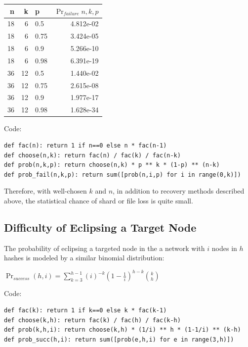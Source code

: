 \documentclass[a4paper,10pt]{article}
\begin{document}
\begin{table}[hbt!]
\begin{center}
\begin{tabular}{r r l r}
n & k & p & $\Pr_{failure}{n,k,p}$\\
\hline  18& 6&   0.5  & 4.812e-02\\
\hline  18& 6&   0.75&3.424e-05\\
\hline  18& 6&   0.9  & 5.266e-10\\
\hline  18& 6&   0.98&6.391e-19\\
\hline  36& 12& 0.5  &1.440e-02\\
\hline  36& 12&  0.75&2.615e-08\\
\hline  36& 12&  0.9  &1.977e-17\\
\hline  36& 12&  0.98&1.628e-34\\
\end{tabular}
\end{center}
\end{table}

Code:
\begin{lstlisting}
def fac(n): return 1 if n==0 else n * fac(n-1)
def choose(n,k): return fac(n) / fac(k) / fac(n-k)
def prob(n,k,p): return choose(n,k) * p ** k * (1-p) ** (n-k)
def prob_fail(n,k,p): return sum([prob(n,i,p) for i in range(0,k)])
\end{lstlisting}

Therefore, with well-chosen $ k $ and $ n $, in addition to recovery methods described above, the statistical chance of shard or file loss is quite small.

\subsection{Difficulty of Eclipsing a Target Node}
The probability of eclipsing a targeted node in the a network with $ i $ nodes in $ h $ hashes is modeled by a similar binomial distribution:

{\centering
$\Pr_{success}(h, i) = \displaystyle \sum_{k=3}^{h-1} (i)^{-k}(1-\frac{1}{i})^{h-k}{k \choose h}$
\\}


Code:
\begin{lstlisting}
def fac(k): return 1 if k==0 else k * fac(k-1)
def choose(k,h): return fac(k) / fac(h) / fac(k-h)
def prob(k,h,i): return choose(k,h) * (1/i) ** h * (1-1/i) ** (k-h)
def prob_succ(h,i): return sum([prob(e,h,i) for e in range(3,h)])
\end{lstlisting}
\end{document}
